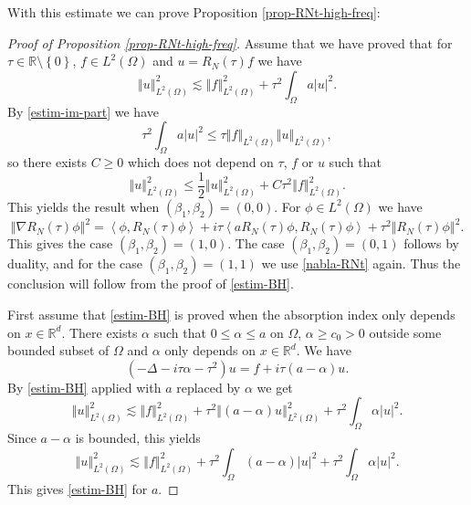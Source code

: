 \documentclass[10pt, a4paper,reqno]{amsart}
\theoremstyle{plain}
\theoremstyle{definition}
\theoremstyle{remark}
\begin{document}
With this estimate we can prove Proposition \ref{prop-RNt-high-freq}:

\begin{proof} [Proof of Proposition \ref{prop-RNt-high-freq}]

{\noindent {\bf $\bullet$}\quad } Assume that we have proved that for ${\tau} \in {\mathbb{R}} \setminus {\left\{ 0 \right\}}$, $f \in L^2({\Omega})$ and $u = {R_N({\tau})} f$ we have 
\begin{equation} \label{estim-BH}
{\left\Vert {u}\right\Vert}_{L^2({\Omega})}^2 \lesssim {\left\Vert {f}\right\Vert}_{L^2({\Omega})}^2 + {\tau}^2 \int_{\Omega} a{\left\vert u\right\vert}^2.
\end{equation}
By \eqref{estim-im-part} we have 
\[
{\tau}^2 \int_{\Omega} a {\left\vert u\right\vert}^2 {\leqslant} {\tau} {\left\Vert f\right\Vert}_{L^2({\Omega})} {\left\Vert u\right\Vert}_{L^2({\Omega})},
\]
so there exists $C {\geqslant} 0$ which does not depend on ${\tau}$, $f$ or $u$ such that
\[
{\left\Vert {u}\right\Vert}_{L^2({\Omega})}^2 {\leqslant} \frac 12 {\left\Vert {u}\right\Vert}_{L^2({\Omega})}^2 + C {\tau}^2 {\left\Vert {f}\right\Vert}_{L^2({\Omega})}^2.
\]
This yields the result when $({\beta}_1,{\beta}_2) = (0,0)$. 
For ${\phi} \in L^2({\Omega})$ we have 
\begin{equation} \label{nabla-RNt}
{\left\Vert {\nabla {R_N({\tau})} {\phi}}\right\Vert}^2 = {\left< {\phi} , {{R_N({\tau})} {\phi}} \right>} + i {\tau} {\left< {a {R_N({\tau})} {\phi}} , {{R_N({\tau})} {\phi}} \right>} + {\tau}^2 {\left\Vert {{R_N({\tau})} {\phi}}\right\Vert}^2.
\end{equation}
This gives the case $({\beta}_1,{\beta}_2) = (1,0)$. The case $({\beta}_1,{\beta}_2) = (0,1)$ follows by duality, and for the case $({\beta}_1,{\beta}_2) = (1,1)$ we use \eqref{nabla-RNt} again. Thus the conclusion will follow from the proof of \eqref{estim-BH}.

{\noindent {\bf $\bullet$}\quad } First assume that \eqref{estim-BH} is proved when the absorption index only depends on $x \in {\mathbb{R}}^d$. There exists ${\alpha}$ such that $0 {\leqslant} {\alpha} {\leqslant} a$ on ${\Omega}$, ${\alpha} {\geqslant} c_0 >0$ outside some bounded subset of ${\Omega}$ and ${\alpha}$ only depends on $x \in {\mathbb{R}}^d$. We have 
\[
(-{\Delta} -i{\tau} {\alpha} - {\tau}^2) u = f + i{\tau}(a-{\alpha}) u.
\]
By \eqref{estim-BH} applied with $a$ replaced by ${\alpha}$ we get 
\[
{\left\Vert {u}\right\Vert}_{L^2({\Omega})}^2 \lesssim {\left\Vert {f}\right\Vert}_{L^2({\Omega})}^2 + {\tau}^2 {\left\Vert {(a-{\alpha}) u}\right\Vert}_{L^2({\Omega})}^2 + {\tau}^2 \int_{\Omega} {\alpha} {\left\vert u\right\vert}^2.
\]
Since $a - {\alpha}$ is bounded, this yields
\[
{\left\Vert {u}\right\Vert}_{L^2({\Omega})}^2 \lesssim {\left\Vert {f}\right\Vert}_{L^2({\Omega})}^2 + {\tau}^2 \int_{\Omega} (a-{\alpha}) {\left\vert u\right\vert}^2 + {\tau}^2 \int_{\Omega} {\alpha} {\left\vert u\right\vert}^2.
\]
This gives \eqref{estim-BH} for $a$. 


\end{proof}
\end{document}
